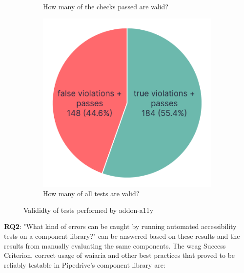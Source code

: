 \documentclass{master_thesis}
\begin{document}
\begin{figure}[ht]
\begin{subfigure}{0.3\textwidth}
	\caption{How many of the checks passed are valid?}
	\label{fig:checks-validity-passed}
	\end{subfigure}
	\hspace{0.03\textwidth}
	\begin{subfigure}{0.3\textwidth}
	\includegraphics[width=\textwidth]{img/all-test-results.png}
	\caption{How many of all tests are valid?}
	\label{fig:checks-validity-all}
	\end{subfigure}
\caption{Valididty of tests performed by addon-a11y}
\label{fig:checks-validity}
\end{figure}

\textbf{RQ2}: "What kind of errors can be caught by running automated accessibility tests on a component library?" can be answered based on these results and the results from manually evaluating the same components. The \ac{wcag} Success Criterion, correct usage of \ac{waiaria} and other best practices that proved to be reliably testable in Pipedrive's component library are:
\end{document}
